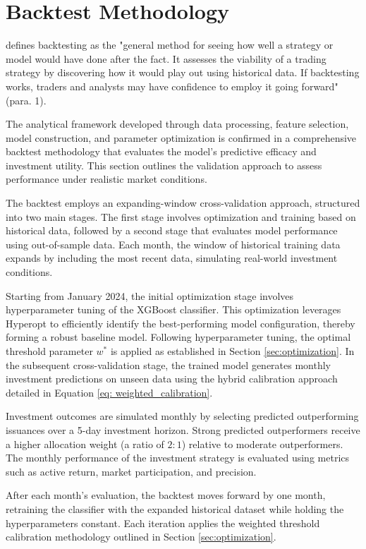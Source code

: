 \section{Backtest Methodology}

\textcite{Chen2024BacktestingDownsides} defines backtesting as the "general method for seeing how well a strategy or model would have done after the fact. It assesses the viability of a trading strategy by discovering how it would play out using historical data. If backtesting works, traders and analysts may have confidence to employ it going forward" (para. 1).

The analytical framework developed through data processing, feature selection, model construction, and parameter optimization is confirmed in a comprehensive backtest methodology that evaluates the model's predictive efficacy and investment utility. This section outlines the validation approach to assess performance under realistic market conditions.

The backtest employs an expanding-window cross-validation approach, structured into two main stages. The first stage involves optimization and training based on historical data, followed by a second stage that evaluates model performance using out-of-sample data. Each month, the window of historical training data expands by including the most recent data, simulating real-world investment conditions.

Starting from January 2024, the initial optimization stage involves hyperparameter tuning of the XGBoost classifier. This optimization leverages Hyperopt to efficiently identify the best-performing model configuration, thereby forming a robust baseline model. Following hyperparameter tuning, the optimal threshold parameter $w^*$ is applied as established in Section \ref{sec:optimization}. In the subsequent cross-validation stage, the trained model generates monthly investment predictions on unseen data using the hybrid calibration approach detailed in Equation \ref{eq: weighted_calibration}.

Investment outcomes are simulated monthly by selecting predicted outperforming issuances over a 5-day investment horizon. Strong predicted outperformers receive a higher allocation weight (a ratio of $2:1$) relative to moderate outperformers. The monthly performance of the investment strategy is evaluated using metrics such as active return, market participation, and precision.

After each month's evaluation, the backtest moves forward by one month, retraining the classifier with the expanded historical dataset while holding the hyperparameters constant. Each iteration applies the weighted threshold calibration methodology outlined in Section \ref{sec:optimization}.

